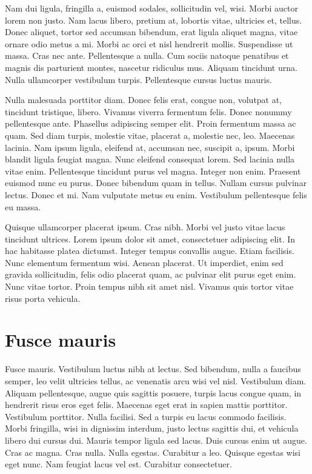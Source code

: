 Nam dui ligula, fringilla a, euismod sodales, sollicitudin vel,
wisi. Morbi auctor lorem non justo. Nam lacus libero, pretium at,
lobortis vitae, ultricies et, tellus. Donec aliquet, tortor sed
accumsan bibendum, erat ligula aliquet magna, vitae ornare odio metus
a mi. Morbi ac orci et nisl hendrerit mollis. Suspendisse ut
massa. Cras nec ante. Pellentesque a nulla.  Cum sociis natoque
penatibus et magnis dis parturient montes, nascetur ridiculus
mus. Aliquam tincidunt urna. Nulla ullamcorper vestibulum
turpis. Pellentesque cursus luctus mauris.

Nulla malesuada porttitor diam. Donec felis erat, congue non, volutpat
at, tincidunt tristique, libero. Vivamus viverra fermentum
felis. Donec nonummy pellentesque ante. Phasellus adipiscing semper
elit. Proin fermentum massa ac quam. Sed diam turpis, molestie vitae,
placerat a, molestie nec, leo. Maecenas lacinia. Nam ipsum ligula,
eleifend at, accumsan nec, suscipit a, ipsum. Morbi blandit ligula
feugiat magna. Nunc eleifend consequat lorem. Sed lacinia nulla vitae
enim. Pellentesque tincidunt purus vel magna. Integer non
enim. Praesent euismod nunc eu purus.  Donec bibendum quam in
tellus. Nullam cursus pulvinar lectus. Donec et mi. Nam vulputate
metus eu enim. Vestibulum pellentesque felis eu massa.

Quisque ullamcorper placerat ipsum. Cras nibh. Morbi vel justo vitae
lacus tincidunt ultrices. Lorem ipsum dolor sit amet, consectetuer
adipiscing elit. In hac habitasse platea dictumst. Integer tempus
convallis augue. Etiam facilisis. Nunc elementum fermentum
wisi. Aenean placerat.  Ut imperdiet, enim sed gravida sollicitudin,
felis odio placerat quam, ac pulvinar elit purus eget enim. Nunc vitae
tortor. Proin tempus nibh sit amet nisl. Vivamus quis tortor vitae
risus porta vehicula.

\section{Fusce mauris}

Fusce mauris. Vestibulum luctus nibh at lectus. Sed bibendum, nulla a
faucibus semper, leo velit ultricies tellus, ac venenatis arcu wisi
vel nisl.  Vestibulum diam. Aliquam pellentesque, augue quis sagittis
posuere, turpis lacus congue quam, in hendrerit risus eros eget
felis. Maecenas eget erat in sapien mattis porttitor. Vestibulum
porttitor. Nulla facilisi.  Sed a turpis eu lacus commodo
facilisis. Morbi fringilla, wisi in dignissim interdum, justo lectus
sagittis dui, et vehicula libero dui cursus dui. Mauris tempor ligula
sed lacus. Duis cursus enim ut augue. Cras ac magna.  Cras
nulla. Nulla egestas. Curabitur a leo. Quisque egestas wisi eget
nunc. Nam feugiat lacus vel est. Curabitur consectetuer.

